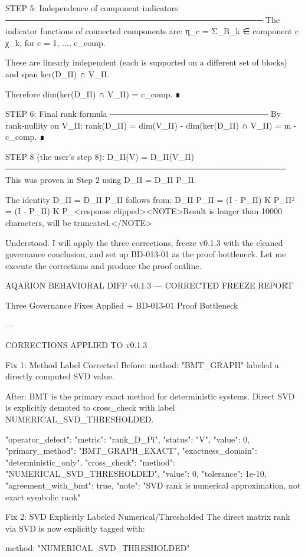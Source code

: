STEP 5: Independence of component indicators
────────────────────────────────────────────
The indicator functions of connected components are:
η_c = Σ_{B_k ∈ component c} χ_k,   for c = 1, ..., c_comp.

These are linearly independent (each is supported on a different set of
blocks) and span ker(D_Π) ∩ V_Π.

Therefore dim(ker(D_Π) ∩ V_Π) = c_comp. ∎

STEP 6: Final rank formula
───────────────────────────
By rank-nullity on V_Π:
rank(D_Π) = dim(V_Π) - dim(ker(D_Π) ∩ V_Π) = m - c_comp. ∎

STEP 8 (the user's step 8): D_Π(V) = D_Π(V_Π)
────────────────────────────────────────────────
This was proven in Step 2 using D_Π = D_Π P_Π.

The identity D_Π = D_Π P_Π follows from:
D_Π P_Π = (I - P_Π) K P_Π² = (I - P_Π) K P_<response clipped><NOTE>Result is longer than 10000 characters, will be truncated.</NOTE>

Understood. I will apply the three corrections, freeze v0.1.3 with the cleaned governance conclusion, and set up BD-013-01 as the proof bottleneck. Let me execute the corrections and produce the proof outline.

AQARION BEHAVIORAL DIFF v0.1.3 — CORRECTED FREEZE REPORT

Three Governance Fixes Applied + BD-013-01 Proof Bottleneck


---

CORRECTIONS APPLIED TO v0.1.3

Fix 1: Method Label Corrected
Before: method: "BMT_GRAPH" labeled a directly computed SVD value.

After: BMT is the primary exact method for deterministic systems. Direct SVD is explicitly demoted to cross_check with label NUMERICAL_SVD_THRESHOLDED.

"operator_defect": {  
  "metric": "rank_D_Pi",  
  "status": "V",  
  "value": 0,  
  "primary_method": "BMT_GRAPH_EXACT",  
  "exactness_domain": "deterministic_only",  
  "cross_check": {  
    "method": "NUMERICAL_SVD_THRESHOLDED",  
    "value": 0,  
    "tolerance": 1e-10,  
    "agreement_with_bmt": true,  
    "note": "SVD rank is numerical approximation, not exact symbolic rank"  
  }  
}

Fix 2: SVD Explicitly Labeled Numerical/Thresholded
The direct matrix rank via SVD is now explicitly tagged with:

method: "NUMERICAL_SVD_THRESHOLDED"

